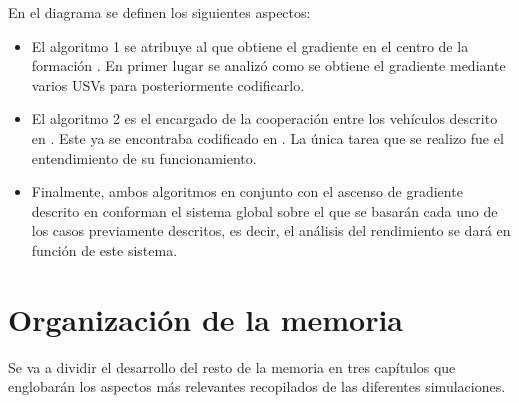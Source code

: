 En el diagrama se definen los siguientes aspectos:

\begin{itemize}
	\item El algoritmo 1 se atribuye al que obtiene el gradiente en el centro de la formación \cite{Estimacion_Gradiente}. En primer lugar se analizó como se obtiene el gradiente mediante varios USVs para posteriormente codificarlo.
	\item El algoritmo 2 es el encargado de la cooperación entre los vehículos descrito en \cite{Control_Formacion}. Este ya se encontraba codificado en \cite{Git_Hector}. La única tarea que se realizo fue el entendimiento de su funcionamiento.
	\item Finalmente, ambos algoritmos en conjunto con el ascenso de gradiente descrito en \cite{Adicional_Estimacion_1} conforman el sistema global sobre el que se basarán cada uno de los casos previamente descritos, es decir, el análisis del rendimiento se dará en función de este sistema. 
\end{itemize}

\section{Organización de la memoria}

Se va a dividir el desarrollo del resto de la memoria en tres capítulos que englobarán los aspectos más relevantes recopilados de las diferentes simulaciones.

